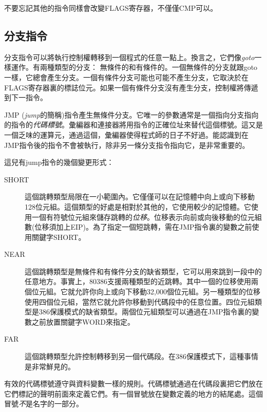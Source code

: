 不要忘記其他的指令同樣會改變FLAGS寄存器，不僅僅{\code CMP}可以。
  

\subsection{分支指令}

分支指令可以將執行控制權轉移到一個程式的任意一點上。換言之，它們像\emph{goto}一樣運作。有兩種類型的分支：
無條件的和有條件的。一個無條件的分支就跟goto一樣，它總會產生分支。一個有條件分支可能也可能不產生分支，它取決於在FLAGS寄存器裏的標誌位元。如果一個有條件分支沒有產生分支，控制權將傳遞到下一指令。

 {\code JMP}
(\emph{jump}的簡稱)指令產生無條件分支。它唯一的參數通常是一個指向分支指向的指令的\emph{代碼標號}。彙編器和連接器將用指令的正確位址來替代這個標號。這又是一個乏味的運算元，通過這個，彙編器使得程式師的日子不好過。能認識到在{\code
JMP}指令後的指令不會被執行，除非另一條分支指令指向它，是非常重要的。

這兒有jump指令的幾個變更形式：
\begin{description}

\item[SHORT] 這個跳轉類型局限在一小範圍內。它僅僅可以在記憶體中向上或向下移動128位元組。這個類型的好處是相對於其他的，它使用較少的記憶體。它使用一個有符號位元組來儲存跳轉的\emph{位移}。位移表示向前或向後移動的位元組數(位移須加上EIP)。為了指定一個短跳轉，需在{\code JMP}指令裏的變數之前使用關鍵字{\code SHORT}。

\item[NEAR] 這個跳轉類型是無條件和有條件分支的缺省類型，它可以用來跳到一段中的任意地方。事實上，80386支援兩種類型的近跳轉。其中一個的位移使用兩個位元組。它就允許你向上或向下移動32,000個位元組。另一種類型的位移使用四個位元組，當然它就允許你移動到代碼段中的任意位置。四位元組類型是386保護模式的缺省類型。兩個位元組類型可以通過在{\code JMP}指令裏的變數之前放置關鍵字{\code WORD}來指定。

\item[FAR] 這個跳轉類型允許控制轉移到另一個代碼段。在386保護模式下，這種事情是非常鮮見的。
\end{description}

有效的代碼標號遵守與資料變數一樣的規則。代碼標號通過在代碼段裏把它們放在它們標記的聲明前面來定義它們。有一個冒號放在變數定義的地方的結尾處。這個冒號\emph{不}是名字的一部分。

